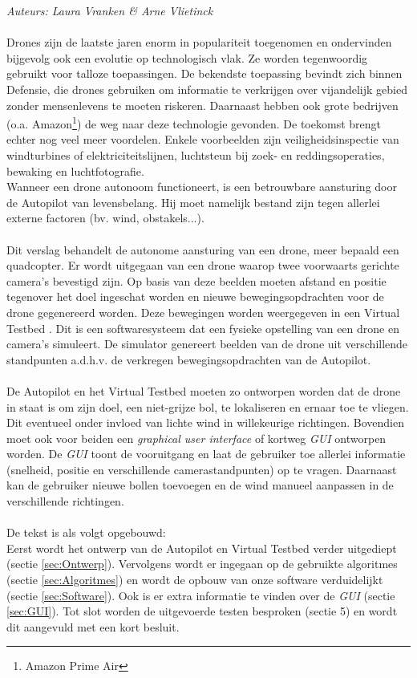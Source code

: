 {\em Auteurs: Laura Vranken \& Arne Vlietinck}
\\\\
\noindent
Drones zijn de laatste jaren enorm in populariteit toegenomen en ondervinden bijgevolg ook een evolutie op technologisch vlak. Ze worden tegenwoordig gebruikt voor talloze toepassingen. De bekendste toepassing bevindt zich binnen Defensie, die drones gebruiken om informatie te verkrijgen over vijandelijk gebied zonder mensenlevens te moeten riskeren. Daarnaast hebben ook grote bedrijven (o.a. Amazon\footnote{Amazon Prime Air}) de weg naar deze technologie gevonden. De toekomst brengt echter nog veel meer voordelen. Enkele voorbeelden  \cite{website:microdrones} zijn veiligheidsinspectie van windturbines of elektriciteitslijnen, luchtsteun bij zoek- en reddingsoperaties, bewaking en luchtfotografie.
\\
Wanneer een drone autonoom functioneert, is een betrouwbare aansturing door de Autopilot van levensbelang. Hij moet namelijk bestand zijn tegen allerlei externe factoren (bv. wind, obstakels...).
\\
\\
Dit verslag behandelt de autonome aansturing van een drone, meer bepaald een quadcopter. Er wordt uitgegaan van een drone waarop twee voorwaarts gerichte camera's bevestigd zijn. Op basis van deze beelden moeten afstand en positie tegenover het doel ingeschat worden en nieuwe bewegingsopdrachten voor de drone gegenereerd worden. Deze bewegingen worden weergegeven in een Virtual Testbed \cite{arcticle:opgavePeno}. Dit is een softwaresysteem dat een fysieke opstelling van een drone en camera's simuleert. De simulator genereert beelden van de drone uit verschillende standpunten a.d.h.v. de verkregen bewegingsopdrachten van de Autopilot. 
\\
\\
De Autopilot en het Virtual Testbed moeten zo ontworpen worden dat de drone in staat is om zijn doel, een niet-grijze bol, te lokaliseren en ernaar toe te vliegen. Dit eventueel onder invloed van lichte wind in willekeurige richtingen. Bovendien moet ook voor beiden een \textit{graphical user interface} of kortweg \textit{GUI} ontworpen worden. De \textit{GUI} toont de vooruitgang en laat de gebruiker toe allerlei informatie (snelheid, positie en verschillende camerastandpunten) op te vragen. Daarnaast kan de gebruiker nieuwe bollen toevoegen en de wind manueel aanpassen in de verschillende richtingen. 
\\
\\
De tekst is als volgt opgebouwd:\\
 Eerst wordt het ontwerp van de Autopilot en Virtual Testbed verder uitgediept (sectie \ref{sec:Ontwerp}). Vervolgens wordt er ingegaan op de gebruikte algoritmes (sectie \ref{sec:Algoritmes}) en wordt de opbouw van onze software verduidelijkt (sectie \ref{sec:Software}). Ook is er extra informatie te vinden over de \textit{GUI} (sectie \ref{sec:GUI}). Tot slot worden de uitgevoerde testen besproken (sectie 5) en wordt dit aangevuld met een kort besluit.